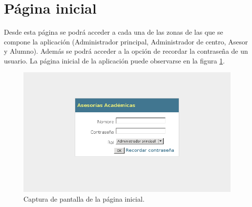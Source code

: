 \section{Página inicial}\label{paginaInicial}

  \paragraph{}Desde esta página se podrá acceder a cada una de las zonas de las
  que se compone la aplicación (Administrador principal, Administrador de
  centro, Asesor y Alumno). Además se podrá acceder a la opción de recordar la
  contraseña de un usuario. La página inicial de la aplicación puede
  observarse en la figura \ref{capturaPaginaInicial}.

  \begin{figure}[!ht]
    \begin{center}
      \includegraphics[scale=0.55]{3.Caracteristicas_Interfaz/3.2.Pagina_Inicial/pagina_inicial.png}
      \caption{Captura de pantalla de la página inicial.}
      \label{capturaPaginaInicial}
    \end{center}
  \end{figure}
